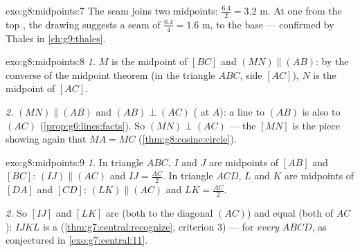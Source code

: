 \begin{solution}{exo:g8:midpoints:7}
The seam joins two midpoints: $\frac{6.4}{2} = 3.2$ m. At one
 from the top , the drawing suggests a seam of
$\frac{6.4}{4} = 1.6$ m,  to the base --- confirmed by Thales
in \cref{ch:g9:thales}.
\end{solution}

\begin{solution}{exo:g8:midpoints:8}
\emph{1.} $M$ is the midpoint of $[BC]$ and $(MN) \parallel (AB)$:
by the converse of the midpoint theorem (in the triangle $ABC$,
side $[AC]$), $N$ is the midpoint of $[AC]$.

\emph{2.} $(MN) \parallel (AB)$ and $(AB) \perp (AC)$ (
at $A$): a line  to $(AB)$ is also  to $(AC)$
(\cref{prop:g6:lines:facts}). So $(MN) \perp (AC)$ --- the 
$[MN]$ is the  piece showing again that
$MA = MC$ (\cref{thm:g8:cosine:circle}).
\end{solution}

\begin{solution}{exo:g8:midpoints:9}
\emph{1.} In triangle $ABC$, $I$ and $J$ are midpoints of $[AB]$ and
$[BC]$: $(IJ) \parallel (AC)$ and $IJ = \frac{AC}{2}$. In triangle
$ACD$, $L$ and $K$ are midpoints of $[DA]$ and $[CD]$:
$(LK) \parallel (AC)$ and $LK = \frac{AC}{2}$.

\emph{2.} So $[IJ]$ and $[LK]$ are  (both  to the
diagonal $(AC)$) and equal (both  of $AC$): $IJKL$ is a
 (\cref{thm:g7:central:recognize}, criterion 3) ---
for \emph{every}  $ABCD$, as conjectured in
\cref{exo:g7:central:11}.
\end{solution}

